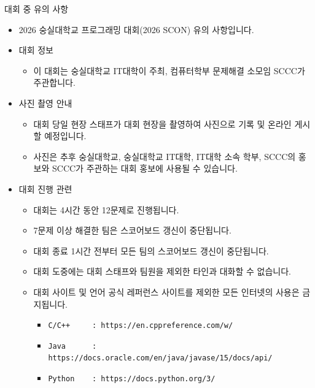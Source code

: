 {
    \indent
    \Large
    
    대회 중 유의 사항
}

\begin{itemize}[noitemsep]
    \item 2026 숭실대학교 프로그래밍 대회(2026 SCON) 유의 사항입니다.
    
    \item 대회 정보
    
    \begin{itemize}[noitemsep]
        \item 이 대회는 숭실대학교 IT대학이 주최, 컴퓨터학부 문제해결 소모임 SCCC가 주관합니다.
    \end{itemize}
    
    \item 사진 촬영 안내
    
    \begin{itemize}[noitemsep]
        \item 대회 당일 현장 스태프가 대회 현장을 촬영하여 사진으로 기록 및 온라인 게시할 예정입니다.
        \item 사진은 추후 숭실대학교, 숭실대학교 IT대학, IT대학 소속 학부, SCCC의 홍보와 SCCC가 주관하는 대회 홍보에 사용될 수 있습니다.
    \end{itemize}

    \item 대회 진행 관련

    \begin{itemize}[noitemsep]
        \item 대회는 4시간 동안 12문제로 진행됩니다.
        \item 7문제 이상 해결한 팀은 스코어보드 갱신이 중단됩니다.
        \item 대회 종료 1시간 전부터 모든 팀의 스코어보드 갱신이 중단됩니다.
        \item 대회 도중에는 대회 스태프와 팀원을 제외한 타인과 대화할 수 없습니다.
        \item 대회 사이트 및 언어 공식 레퍼런스 사이트를 제외한 모든 인터넷의 사용은 금지됩니다.

        \begin{itemize}[noitemsep]
            \item \texttt{C/C++ \ \ \ \ : https://en.cppreference.com/w/}
            \item \texttt{Java \ \ \ \ \ : https://docs.oracle.com/en/java/javase/15/docs/api/}
            \item \texttt{Python \ \ \ : https://docs.python.org/3/}
        \end{itemize}


\end{itemize}
\end{itemize}
